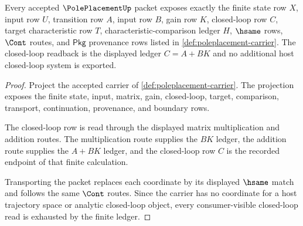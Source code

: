 \begin{theorem}
\label{thm:poleplacement-closed-loop-ledger}
Every accepted $\PolePlacementUp$ packet exposes exactly the finite state row
$X$, input row $U$, transition row $A$, input row $B$, gain row $K$,
closed-loop row $C$, target characteristic row $T$, characteristic-comparison
ledger $H$, $\hsame$ rows, $\Cont$ routes, and $\mathsf{Pkg}$ provenance rows
listed in \autoref{def:poleplacement-carrier}. The closed-loop readback is the
displayed ledger $C=A+BK$ and no additional host closed-loop system is
exported.
\end{theorem}
\begin{proof}
Project the accepted carrier of \autoref{def:poleplacement-carrier}. The
projection exposes the finite state, input, matrix, gain, closed-loop, target,
comparison, transport, continuation, provenance, and boundary rows.

The closed-loop row is read through the displayed matrix multiplication and
addition routes. The multiplication route supplies the $BK$ ledger, the
addition route supplies the $A+BK$ ledger, and the closed-loop row $C$ is the
recorded endpoint of that finite calculation.

Transporting the packet replaces each coordinate by its displayed $\hsame$
match and follows the same $\Cont$ routes. Since the carrier has no coordinate
for a host trajectory space or analytic closed-loop object, every
consumer-visible closed-loop read is exhausted by the finite ledger.
\end{proof}

